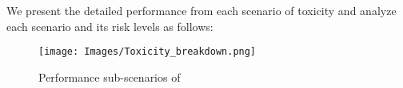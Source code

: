 We present the detailed performance from each scenario of toxicity and analyze each scenario and its risk levels as follows:
\begin{figure*}[h]
    \centering
    \texttt{[image: Images/Toxicity\_breakdown.png]}
    \vspace{-0.5in}
    \caption{Performance sub-scenarios of \llm}
\label{fig:toxicity-radar}
\end{figure*} 